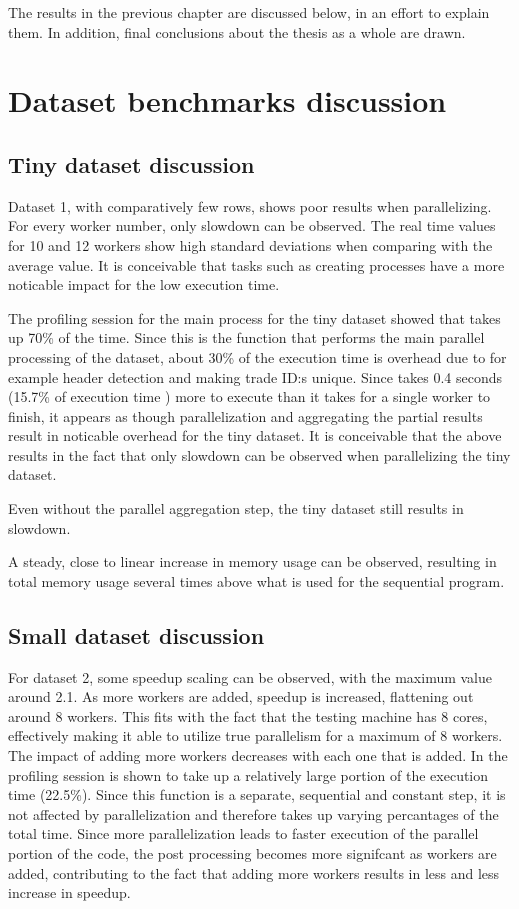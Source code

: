 The results in the previous chapter are discussed below, in an effort to explain them. In addition, final conclusions
about the thesis as a whole are drawn.

\section{Dataset benchmarks discussion}
\subsection{Tiny dataset discussion}
Dataset 1, with comparatively few rows, shows poor results when parallelizing. For every worker number, only slowdown can be observed.
The real time values for 10 and 12 workers show high standard deviations when comparing with the average value. It is conceivable that
tasks such as creating processes have a more noticable impact for the low execution time.

The profiling session for the main process for the tiny dataset showed that  takes up 70\% of the time. Since this is the function
that performs the main parallel processing of the dataset, about 30\% of the execution time is overhead due to for example header detection
and making trade ID:s unique. Since  takes 0.4 seconds (15.7\% of execution time ) more to execute than it takes for a single worker to finish,
it appears as though parallelization and aggregating the partial results result in noticable overhead for the tiny dataset.
It is conceivable that the above results in the fact that only slowdown can be observed when parallelizing the tiny dataset.

Even without the parallel aggregation step, the tiny dataset still results in slowdown.

A steady, close to linear increase in memory usage can be observed, resulting in total memory usage several times above what is
used for the sequential program.

\subsection{Small dataset discussion}
For dataset 2, some speedup scaling can be observed, with the maximum value around 2.1. As more workers are added, speedup is increased,
flattening out around 8 workers. This fits with the fact that the testing machine has 8 cores, effectively making it able to utilize 
true parallelism for a maximum of 8 workers. The impact of adding more workers decreases with each one that is added. In the profiling session
 is shown to take up a relatively large portion of the execution time (22.5\%). Since this function is a separate,
sequential and constant step, it is not affected by parallelization and therefore takes up varying percantages of the total time. Since more parallelization
leads to faster execution of the parallel portion of the code, the post processing becomes more signifcant as workers are added, contributing to the fact
that adding more workers results in less and less increase in speedup.

